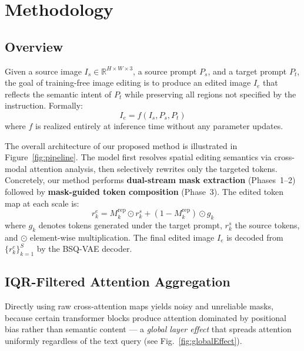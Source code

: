 
\section{Methodology}
\label{section:method}

\subsection{Overview}
\label{sec:overview}

Given a source image $I_s \in \mathbb{R}^{H \times W \times 3}$, a source prompt $P_s$, and a target prompt $P_t$, the goal of training-free image editing is to produce an edited image $I_e$ that reflects the semantic intent of $P_t$ while preserving all regions not specified by the instruction. Formally:
\begin{equation}
    I_e = f(I_s, P_s, P_t)
\end{equation}
where $f$ is realized entirely at inference time without any parameter updates.

The overall architecture of our proposed method is illustrated in Figure~\ref{fig:pipeline}. The model first resolves spatial editing semantics via cross-modal attention analysis, then selectively rewrites only the targeted tokens. Concretely, our method performs \textbf{dual-stream mask extraction} (Phases~1--2) followed by \textbf{mask-guided token composition} (Phase~3). The edited token map at each scale is:
\begin{equation}
    r_k^e = M_k^{\mathrm{rep}} \odot r_k^s + (1 - M_k^{\mathrm{rep}}) \odot g_k
\end{equation}
where $g_k$ denotes tokens generated under the target prompt, $r_k^s$ the source tokens, and $\odot$ element-wise multiplication. The final edited image $I_e$ is decoded from $\{r_k^e\}_{k=1}^{S}$ by the BSQ-VAE decoder.

\subsection{IQR-Filtered Attention Aggregation}
\label{sec:mask_construction}


Directly using raw cross-attention maps yields noisy and unreliable masks, because certain transformer blocks produce attention dominated by positional bias rather than semantic content --- a \textit{global layer effect} that spreads attention uniformly regardless of the text query (see Fig.~\ref{fig:globalEffect}).

